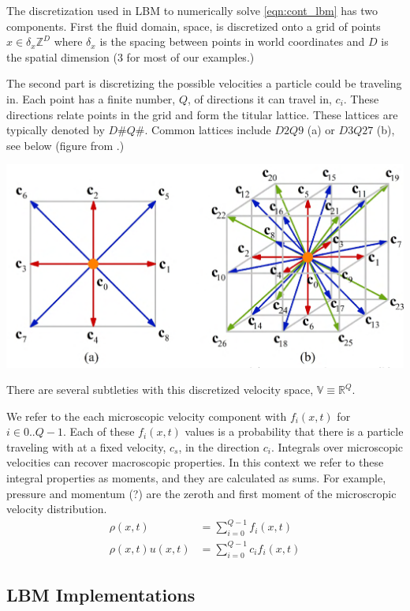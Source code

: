 The discretization used in LBM to numerically solve \ref{eqn:cont_lbm} 
has two components.
First the fluid domain, space, is 
discretized onto a
grid of points $x \in \delta_x \mathbb{Z}^D$
where $\delta_x$ is the spacing between points in world coordinates
and $D$ is the spatial dimension ($3$ for most of our examples.)

The second part is discretizing the possible velocities a particle 
could be traveling in. 
Each point has a finite number, $Q$, of directions it can travel in, $c_i$.
These directions relate points in the grid and form the titular lattice.
These lattices are typically denoted by $D\#Q\#$.
Common lattices include $D2Q9$ (a) or $D3Q27$ (b), see below (figure from \cite{Li2020}.)
\begin{center}
\includegraphics[width=0.6\linewidth]{lattice_figure.png}
\end{center}

There are several subtleties with this discretized velocity space, 
$\mathbb{V} \equiv \mathbb{R}^Q$. 
\begin{outline}
\1 We refer to the each microscopic velocity component with 
$f_i(x, t)$ for $i \in 0..Q - 1$.
\1 Each of these $f_i(x, t)$ values is a probability that there is a particle traveling with at a fixed velocity, $c_s$, in the direction $c_i$.
\1 Integrals over microscopic velocities can recover macroscopic properties.
In this context we refer to these integral properties as moments, 
and they are calculated as sums. 
For example, pressure and momentum (?) are the zeroth and first moment 
of the microscropic velocity distribution.
\begin{align}
  \rho(x, t) &= \sum_{i = 0}^{Q - 1} f_i(x, t) \\
  \rho(x,t)u(x,t) &= \sum_{i = 0}^{Q - 1}c_i f_i(x, t)
\end{align}
\end{outline}

 


\subsection{LBM Implementations}

